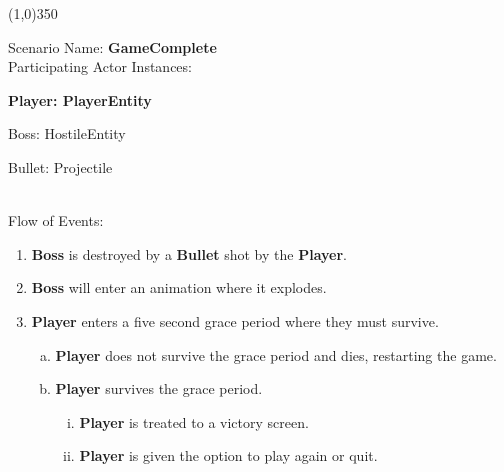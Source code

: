 \documentclass[12pt]{article}       %
\begin{document}
\begin{center} \line(1,0){350} \end{center}
Scenario Name: {\bf GameComplete} \\
Participating Actor Instances:        \hspace{46pt} {\bf Player: PlayerEntity

					          \hspace{2.6 in}   Boss: HostileEntity 

                                                      \hspace{2.6 in}   Bullet: Projectile} \vspace{10pt}  \\ 
Flow of Events: 
\begin{enumerate} 
\item {\bf Boss} is destroyed by a {\bf Bullet} shot by the {\bf Player}.
\item {\bf Boss} will enter an animation where it explodes.
\item {\bf Player} enters  a five second grace period where they must survive.
	\begin{enumerate} [a.]
	\item {\bf Player} does not survive the grace period and dies, restarting the game.
	\item {\bf Player} survives the grace period.
		\begin{enumerate} [i.]
		\item {\bf Player} is treated to a victory screen.
		\item {\bf Player} is given the option to play again or quit.
		\end{enumerate}
	\end{enumerate}
\end{enumerate}
\end{document}
